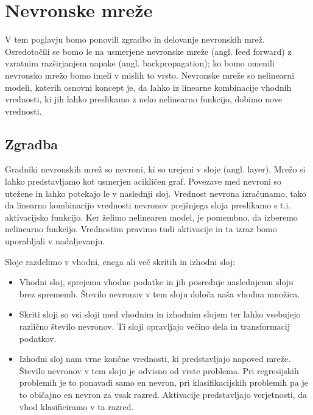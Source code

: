 \chapter{Nevronske mreže}
V tem poglavju bomo ponovili zgradbo in delovanje nevronskih mrež. Osredotočili se bomo le na  usmerjene nevronske mreže (angl. feed forward) z vzratnim razširjanjem napake (angl. backpropagation); ko bomo omenili nevronsko mrežo bomo imeli v mislih to vrsto.
Nevronske mreže so nelinearni modeli, katerih osnovni koncept je, da lahko iz linearne kombinacije vhodnih vrednosti, ki jih lahko preslikamo z neko nelinearno funkcijo, dobimo nove vrednosti.\cite{Hastie2009}


\section{Zgradba}
Gradniki nevronskih mrež so nevroni, ki so urejeni v sloje (angl. layer).
Mrežo si lahko predstavljamo kot usmerjen acikličen graf. Povezave med nevroni so utežene in lahko potekajo le v naslednji sloj.
Vrednost nevrona izračunamo, tako da linearno kombinacijo vrednosti nevronov prejšnjega sloja preslikamo s t.i. aktivacijsko funkcijo. Ker želimo nelinearen model, je pomembno, da izberemo nelinearno funkcijo. Vrednostim pravimo tudi aktivacije in ta izraz bomo uporabljali v nadaljevanju.

Sloje razdelimo v vhodni, enega ali več skritih in izhodni sloj:
\begin{itemize}
    \item Vhodni sloj, sprejema vhodne podatke in jih posreduje naslednjemu sloju brez sprememb. Število nevronov v tem sloju določa naša vhodna množica.
    \item Skriti sloji so vsi sloji med vhodnim in izhodnim slojem ter lahko vsebujejo različno število nevronov. Ti sloji opravljajo večino dela in transformacij podatkov.
    \item Izhodni sloj nam vrne končne vrednosti, ki predstavljajo napoved mreže. Število nevronov v tem sloju je odvisno od vrste problema. Pri regresijskih problemih je to ponavadi samo en nevron, pri klasifikacijskih problemih pa je to običajno en nevron za vsak razred. Aktivacije predstavljajo verjetnosti, da vhod klasificiramo v ta razred.
\end{itemize}

